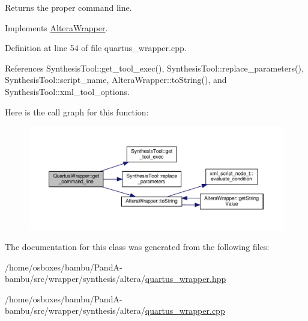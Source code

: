 Returns the proper command line. 



Implements \hyperlink{classAlteraWrapper_a1b6c44694f0bd28b6f458245fd373326}{Altera\+Wrapper}.



Definition at line 54 of file quartus\+\_\+wrapper.\+cpp.



References Synthesis\+Tool\+::get\+\_\+tool\+\_\+exec(), Synthesis\+Tool\+::replace\+\_\+parameters(), Synthesis\+Tool\+::script\+\_\+name, Altera\+Wrapper\+::to\+String(), and Synthesis\+Tool\+::xml\+\_\+tool\+\_\+options.

Here is the call graph for this function\+:
\nopagebreak
\begin{figure}[H]
\begin{center}
\leavevmode
\includegraphics[width=350pt]{db/d46/classQuartusWrapper_af543e4704f8dba7bf429b1c9ce58ac58_cgraph}
\end{center}
\end{figure}


The documentation for this class was generated from the following files\+:\begin{DoxyCompactItemize}
\item 
/home/osboxes/bambu/\+Pand\+A-\/bambu/src/wrapper/synthesis/altera/\hyperlink{quartus__wrapper_8hpp}{quartus\+\_\+wrapper.\+hpp}\item 
/home/osboxes/bambu/\+Pand\+A-\/bambu/src/wrapper/synthesis/altera/\hyperlink{quartus__wrapper_8cpp}{quartus\+\_\+wrapper.\+cpp}\end{DoxyCompactItemize}
